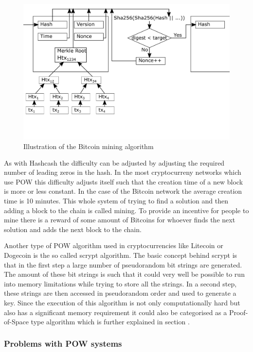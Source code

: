 \begin{figure}[ht]
\includegraphics[width=1\columnwidth]{fig/btc.pdf}
\caption{Illustration of the Bitcoin mining algorithm}
\end{figure}

As with Hashcash the difficulty can be adjusted by adjusting the required number of
leading zeros in the hash. In the most cryptocurreny networks which use POW this difficulty adjusts itself such that the creation time of a new block is more or less constant. In the case of the
Bitcoin network the average creation time is 10 minutes. This whole system of trying to find a solution and then adding a block to the chain is called mining. To provide an incentive for people to
mine there is a reward of some amount of Bitcoins for whoever finds the next solution and adds the next block to the chain.\cite{url:bitcoin}\par Another type of POW algorithm used in cryptocurrencies
like Litecoin or Dogecoin is the so called scrypt algorithm.\cite{url:litecoin_dogecoin} The basic concept behind scrypt is that in the first step a large number of pseudorandom bit strings are
generated. The amount of these bit strings is such that it could very well be possible to run into memory limitations while trying to store all the strings. In a second step, these strings are then
accessed in pseudorandom order and used to generate a key. Since the execution of this algorithm is not only computationally hard but also has a significant memory requirement it could also be
categorised as a Proof-of-Space type algorithm\cite{url:scrypt} which is further explained in section .

\subsubsection{Problems with POW systems}

